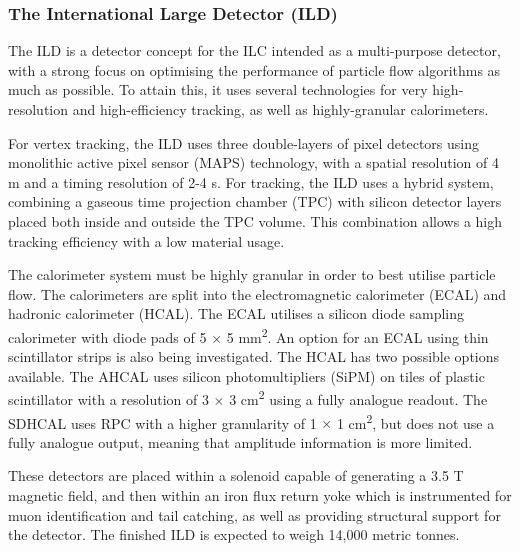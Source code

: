\subsubsection{The International Large Detector (ILD)}

The \acrfull{ILD} is a detector concept for the \acrshort{ILC} intended as a multi-purpose detector, with a strong focus on optimising the performance of particle flow algorithms as much as possible. To attain this, it uses several technologies for very high-resolution and high-efficiency tracking, as well as highly-granular calorimeters.

For vertex tracking, the \acrshort{ILD} uses three double-layers of pixel detectors using monolithic active pixel sensor (\acrshort{MAPS}) technology, with a spatial resolution of 4 \textmu m and a timing resolution of 2-4 \textmu s. For tracking, the \acrshort{ILD} uses a hybrid system, combining a gaseous time projection chamber (\acrshort{TPC}) with silicon detector layers placed both inside and outside the \acrshort{TPC} volume. This combination allows a high tracking efficiency with a low material usage.

The calorimeter system must be highly granular in order to best utilise particle flow. The calorimeters are split into the electromagnetic calorimeter (\acrshort{ECAL}) and hadronic calorimeter (\acrshort{HCAL}). The \acrshort{ECAL} utilises a silicon diode sampling calorimeter with diode pads of 5 $\times$ 5 mm\textsuperscript{2}. An option for an ECAL using thin scintillator strips is also being investigated. The \acrshort{HCAL} has two possible options available. The \acrfull{AHCAL} uses silicon photomultipliers (\acrshort{SiPM}) on tiles of plastic scintillator with a resolution of 3 $\times$ 3 cm\textsuperscript{2} using a fully analogue readout. The \acrfull{SDHCAL} uses \acrfull{RPC} with a higher granularity of 1 $\times$ 1 cm\textsuperscript{2}, but does not use a fully analogue output, meaning that amplitude information is more limited. 

These detectors are placed within a solenoid capable of generating a 3.5 T magnetic field, and then within an iron flux return yoke which is instrumented for muon identification and tail catching, as well as providing structural support for the detector. The finished ILD is expected to weigh 14,000 metric tonnes.

